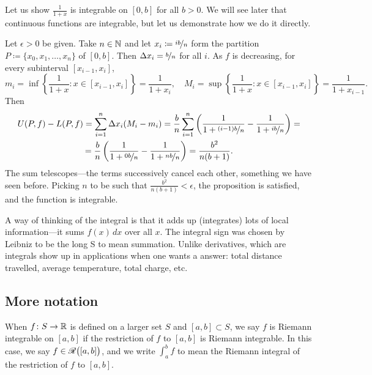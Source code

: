 \begin{example}
Let us show $\frac{1}{1+x}$ is integrable on $[0,b]$ for all $b > 0$.
We will see later that continuous functions are integrable, but let us
demonstrate how we do it directly.

Let $\epsilon > 0$ be given.  Take $n \in {\mathbb{N}}$ and
let $x_i \coloneqq \nicefrac{ib}{n}$ form the 
partition $P \coloneqq \{ x_0,x_1,\ldots,x_n \}$ of $[0,b]$.
Then $\Delta x_i = \nicefrac{b}{n}$ for all $i$.  
As $f$ is decreasing, for every subinterval $[x_{i-1},x_i]$,
\begin{equation*}
m_i
=
\inf \left\{ \frac{1}{1+x} : x \in [x_{i-1},x_i] \right\} = \frac{1}{1+x_i} ,
\quad
M_i
=
\sup \left\{ \frac{1}{1+x} : x \in [x_{i-1},x_i] \right\} =
\frac{1}{1+x_{i-1}} .
\end{equation*}
Then
\begin{multline*}
U(P,f)-L(P,f)
=
\sum_{i=1}^n
\Delta x_i
(M_i-m_i)
=
\frac{b}{n}
\sum_{i=1}^n 
\left( \frac{1}{1+\nicefrac{(i-1)b}{n}} - \frac{1}{1+\nicefrac{ib}{n}} \right) 
=
\\
=
\frac{b}{n}
\left( \frac{1}{1+\nicefrac{0b}{n}} - \frac{1}{1+\nicefrac{nb}{n}} \right) 
=
\frac{b^2}{n(b+1)} .
\end{multline*}
The sum telescopes---the terms successively cancel each other, something
we have seen before.
Picking $n$ to be such that
$\frac{b^2}{n(b+1)} < \epsilon$, the proposition is satisfied, and the
function is integrable.
\end{example}

\begin{remark}
A way of thinking of the integral is that it adds up (integrates) lots of
local information---it sums $f(x)\,dx$ over all $x$.
The integral sign was chosen by Leibniz to be the long S to mean summation.
Unlike derivatives, which are  
integrals show up in applications when
one wants a  answer: total distance travelled, average
temperature, total charge, etc.
\end{remark}

\subsection{More notation}

When $f \colon S \to {\mathbb{R}}$ is defined on a larger set $S$ and
$[a,b] \subset S$,
we say $f$ is Riemann integrable on $[a,b]$ if the restriction of $f$
to $[a,b]$ is Riemann integrable. 
In this case,
we say $f \in {\mathscr{R}}\bigl([a,b]\bigr)$,
and
we write $\int_a^b f$ to mean the Riemann integral
of the restriction of $f$ to $[a,b]$.

